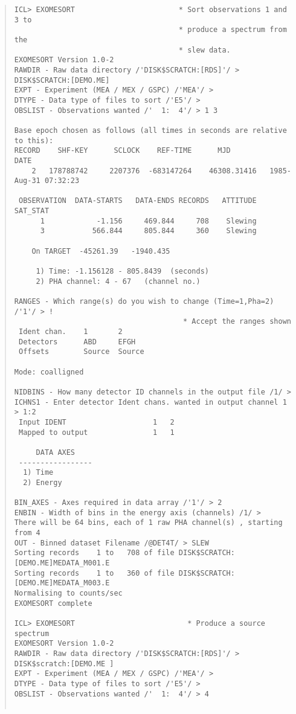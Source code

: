\begin{quote}
\begin{verbatim}
ICL> EXOMESORT                        * Sort observations 1 and 3 to
                                      * produce a spectrum from the 
                                      * slew data.
EXOMESORT Version 1.0-2
RAWDIR - Raw data directory /'DISK$SCRATCH:[RDS]'/ > DISK$SCRATCH:[DEMO.ME]
EXPT - Experiment (MEA / MEX / GSPC) /'MEA'/ > 
DTYPE - Data type of files to sort /'E5'/ > 
OBSLIST - Observations wanted /'  1:  4'/ > 1 3

Base epoch chosen as follows (all times in seconds are relative to this):
RECORD    SHF-KEY      SCLOCK    REF-TIME      MJD                 DATE
    2   178788742     2207376  -683147264    46308.31416   1985-Aug-31 07:32:23

 OBSERVATION  DATA-STARTS   DATA-ENDS RECORDS   ATTITUDE    SAT_STAT
      1            -1.156     469.844     708    Slewing
      3           566.844     805.844     360    Slewing

    On TARGET  -45261.39   -1940.435

     1) Time: -1.156128 - 805.8439  (seconds)
     2) PHA channel: 4 - 67   (channel no.)

RANGES - Which range(s) do you wish to change (Time=1,Pha=2) /'1'/ > !
                                       * Accept the ranges shown
 Ident chan.    1       2
 Detectors      ABD     EFGH
 Offsets        Source  Source

Mode: coalligned

NIDBINS - How many detector ID channels in the output file /1/ > 
ICHNS1 - Enter detector Ident chans. wanted in output channel 1 > 1:2
 Input IDENT                    1   2
 Mapped to output               1   1

     DATA AXES
 -----------------
  1) Time
  2) Energy

BIN_AXES - Axes required in data array /'1'/ > 2
ENBIN - Width of bins in the energy axis (channels) /1/ > 
There will be 64 bins, each of 1 raw PHA channel(s) , starting from 4
OUT - Binned dataset Filename /@DET4T/ > SLEW
Sorting records    1 to   708 of file DISK$SCRATCH:[DEMO.ME]MEDATA_M001.E
Sorting records    1 to   360 of file DISK$SCRATCH:[DEMO.ME]MEDATA_M003.E
Normalising to counts/sec
EXOMESORT complete

ICL> EXOMESORT                          * Produce a source spectrum
EXOMESORT Version 1.0-2
RAWDIR - Raw data directory /'DISK$SCRATCH:[RDS]'/ > DISK$scratch:[DEMO.ME ]
EXPT - Experiment (MEA / MEX / GSPC) /'MEA'/ > 
DTYPE - Data type of files to sort /'E5'/ > 
OBSLIST - Observations wanted /'  1:  4'/ > 4


\end{verbatim}
\end{quote}
